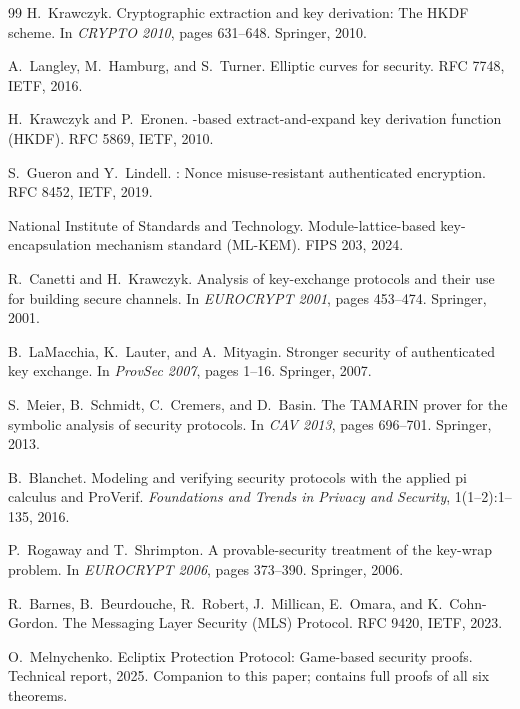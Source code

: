 \documentclass[11pt,a4paper]{article}
\theoremstyle{definition}
\begin{document}
\begin{thebibliography}{99}
H.~Krawczyk.
\newblock Cryptographic extraction and key derivation: The {HKDF} scheme.
\newblock In \emph{CRYPTO 2010}, pages 631--648. Springer, 2010.

A.~Langley, M.~Hamburg, and S.~Turner.
\newblock Elliptic curves for security.
\newblock RFC 7748, IETF, 2016.

H.~Krawczyk and P.~Eronen.
-based extract-and-expand key derivation function ({HKDF}).
\newblock RFC 5869, IETF, 2010.

S.~Gueron and Y.~Lindell.
: Nonce misuse-resistant authenticated encryption.
\newblock RFC 8452, IETF, 2019.

National Institute of Standards and Technology.
\newblock Module-lattice-based key-encapsulation mechanism standard ({ML-KEM}).
\newblock FIPS 203, 2024.

R.~Canetti and H.~Krawczyk.
\newblock Analysis of key-exchange protocols and their use for building secure channels.
\newblock In \emph{EUROCRYPT 2001}, pages 453--474. Springer, 2001.

B.~LaMacchia, K.~Lauter, and A.~Mityagin.
\newblock Stronger security of authenticated key exchange.
\newblock In \emph{ProvSec 2007}, pages 1--16. Springer, 2007.

S.~Meier, B.~Schmidt, C.~Cremers, and D.~Basin.
\newblock The {TAMARIN} prover for the symbolic analysis of security protocols.
\newblock In \emph{CAV 2013}, pages 696--701. Springer, 2013.

B.~Blanchet.
\newblock Modeling and verifying security protocols with the applied pi calculus and {ProVerif}.
\newblock \emph{Foundations and Trends in Privacy and Security}, 1(1--2):1--135, 2016.

P.~Rogaway and T.~Shrimpton.
\newblock A provable-security treatment of the key-wrap problem.
\newblock In \emph{EUROCRYPT 2006}, pages 373--390. Springer, 2006.

R.~Barnes, B.~Beurdouche, R.~Robert, J.~Millican, E.~Omara, and K.~Cohn-Gordon.
\newblock The Messaging Layer Security ({MLS}) Protocol.
\newblock RFC 9420, IETF, 2023.

O.~Melnychenko.
\newblock Ecliptix Protection Protocol: Game-based security proofs.
\newblock Technical report, 2025.
\newblock Companion to this paper; contains full proofs of all six theorems.

\end{thebibliography}
\end{document}
